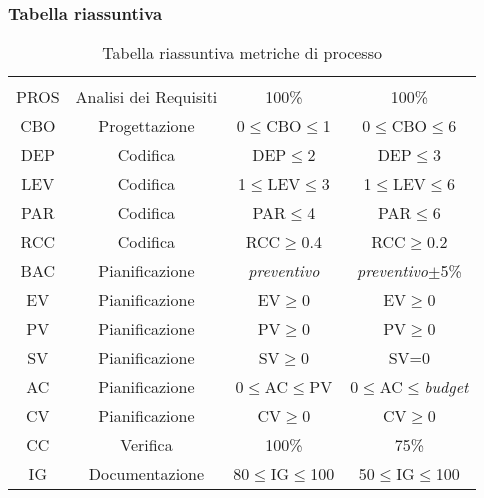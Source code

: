 \subsubsection{Tabella riassuntiva}
\begin{table}[H]
	\begin{center}
				\caption{Tabella riassuntiva metriche di processo}
		\begin{tabular}{cc!{\color[HTML]{9b240a}\vrule width 0.05cm}cc}
			\rowcolorhead
			 &  &  &  \\
			
			PROS & Analisi dei Requisiti & 100\% & 100\%\\
			CBO & Progettazione & 0$\leq$CBO$\leq$1 & 0$\leq$CBO$\leq$6\\
			DEP & Codifica & DEP$\leq$2 & DEP$\leq$3\\
			LEV & Codifica & 1$\leq$LEV$\leq$3 & 1$\leq$LEV$\leq$6\\
			PAR & Codifica & PAR$\leq$4 & PAR$\leq$6\\
			RCC & Codifica & RCC$\geq$0.4 & RCC$\geq$0.2\\
			BAC & Pianificazione & \textit{preventivo} & \textit{preventivo}$\pm$5\%\\
			EV & Pianificazione & EV$\geq$0 & EV$\geq$0\\
			PV & Pianificazione & PV$\geq$0 & PV$\geq$0\\
			SV & Pianificazione & SV$\geq$0 & SV=0\\
			AC & Pianificazione & 0$\leq$AC$\leq$PV & 0$\leq$AC$\leq$\textit{budget}\\
			CV & Pianificazione & CV$\geq$0 & CV$\geq$0\\
			CC & Verifica & 100\% & 75\%\\
			IG & Documentazione & 80$\leq$IG$\leq$100 & 50$\leq$IG$\leq$100\\
		\end{tabular}

	\end{center}
\end{table}